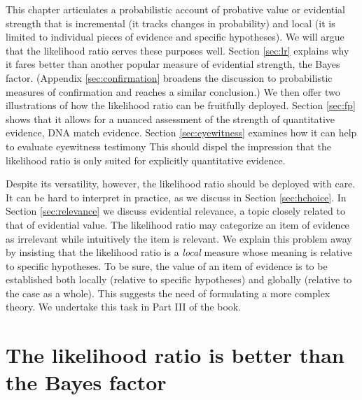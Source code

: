 \documentclass[
  10pt,
  dvipsnames,enabledeprecatedfontcommands]{scrartcl}
\begin{document}
This chapter articulates a probabilistic account of probative value or
evidential strength that is incremental (it tracks changes in
probability) and local (it is limited to individual pieces of evidence
and specific hypotheses). We will argue that the likelihood ratio serves
these purposes well. Section \ref{sec:lr} explains why it fares better
than another popular measure of evidential strength, the Bayes factor.
(Appendix \ref{sec:confirmation} broadens the discussion to
probabilistic measures of confirmation and reaches a similar
conclusion.) We then offer two illustrations of how the likelihood ratio
can be fruitfully deployed. Section \ref{sec:fp} shows that it allows
for a nuanced assessment of the strength of quantitative evidence, DNA
match evidence. Section \ref{sec:eyewitness} examines how it can help to
evaluate eyewitness testimony This should dispel the impression that the
likelihood ratio is only suited for explicitly quantitative evidence.

Despite its versatility, however, the likelihood ratio should be
deployed with care. It can be hard to interpret in practice, as we
discuss in Section \ref{sec:hchoice}. In Section \ref{sec:relevance} we
discuss evidential relevance, a topic closely related to that of
evidential value. The likelihood ratio may categorize an item of
evidence as irrelevant while intuitively the item is relevant. We
explain this problem away by insisting that the likelihood ratio is a
\textit{local} measure whose meaning is relative to specific hypotheses.
To be sure, the value of an item of evidence is to be established both
locally (relative to specific hypotheses) and globally (relative to the
case as a whole). This suggests the need of formulating a more complex
theory. We undertake this task in Part III of the book.

\hypertarget{the-likelihood-ratio-is-better-than-the-bayes-factor}{%
\section{The likelihood ratio is better than the Bayes
factor}\label{the-likelihood-ratio-is-better-than-the-bayes-factor}}

\label{sec:lr}
\end{document}
